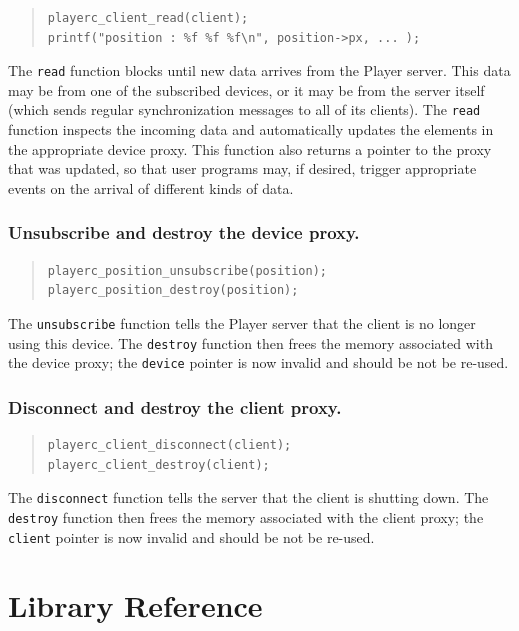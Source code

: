 \documentclass[11pt]{report}
\begin{document}
\begin{quote}\begin{verbatim}
playerc_client_read(client);
printf("position : %f %f %f\n", position->px, ... );
\end{verbatim}\end{quote}
The {\tt read} function blocks until new data arrives from the Player
server.  This data may be from one of the subscribed devices, or it
may be from the server itself (which sends regular synchronization
messages to all of its clients).  The {\tt read} function inspects the
incoming data and automatically updates the elements in the
appropriate device proxy.  This function also returns a pointer to the
proxy that was updated, so that user programs may, if desired, trigger
appropriate events on the arrival of different kinds of data.

\subsection*{Unsubscribe and destroy the device proxy.}

\begin{quote}\begin{verbatim}
playerc_position_unsubscribe(position);
playerc_position_destroy(position);
\end{verbatim}\end{quote}
The {\tt unsubscribe} function tells the Player server that the client
is no longer using this device.  The {\tt destroy} function then frees
the memory associated with the device proxy; the {\tt device} pointer
is now invalid and should be not be re-used.

\subsection*{Disconnect and destroy the client proxy.}

\begin{quote}\begin{verbatim}
playerc_client_disconnect(client);
playerc_client_destroy(client);
\end{verbatim}\end{quote}
The {\tt disconnect} function tells the server that the client is
shutting down.  The {\tt destroy} function then frees the memory
associated with the client proxy; the {\tt client} pointer is now
invalid and should be not be re-used.



\chapter{Library Reference}
\end{document}
